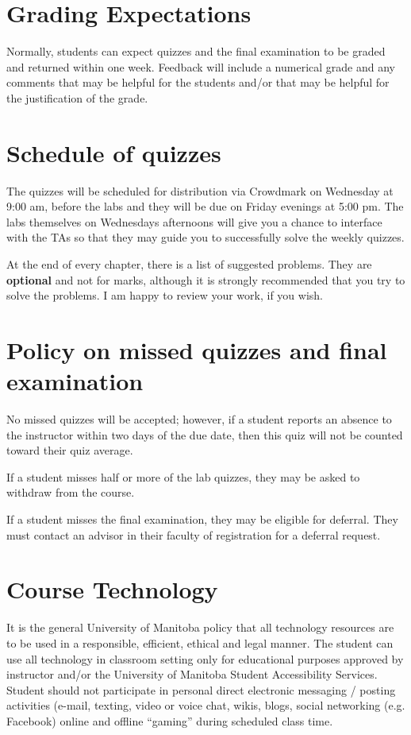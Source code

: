 \documentclass[12pt]{article}
\begin{document}
\section{Grading Expectations}

Normally, students can expect quizzes and the final examination to be graded and returned within one week. Feedback will include a numerical grade and any comments that may be helpful for the students and/or that may be helpful for the justification of the grade.

\section{Schedule of quizzes}

The quizzes will be scheduled for distribution via Crowdmark on Wednesday at 9:00 am, before the labs and they will be due on Friday evenings at 5:00 pm. The labs themselves on Wednesdays afternoons will give you a chance to interface with the TAs so that they may guide you to successfully solve the weekly quizzes.

At the end of every chapter, there is a list of suggested problems. They are {\bf optional} and not for marks, although it is strongly recommended that you try to solve the problems. I am happy to review your work, if you wish.

\section{Policy on missed quizzes and final examination}

No missed quizzes will be accepted; however, if a student reports an absence to the instructor within two days of the due date, then this quiz will not be counted toward their quiz average.

If a student misses half or more of the lab quizzes, they may be asked to withdraw from the course.

If a student misses the final examination, they may be eligible for deferral. They must contact an advisor in their faculty of registration for a deferral request.

\section{Course Technology}

It is the general University of Manitoba policy that all technology resources are to be used in a responsible, efficient, ethical and legal manner. The student can use all technology in classroom setting only for educational purposes approved by instructor and/or the University of Manitoba Student Accessibility Services. Student should not participate in personal direct electronic messaging / posting activities (e-mail, texting, video or voice chat, wikis, blogs, social networking (e.g. Facebook) online and offline ``gaming'' during scheduled class time.
\end{document}
